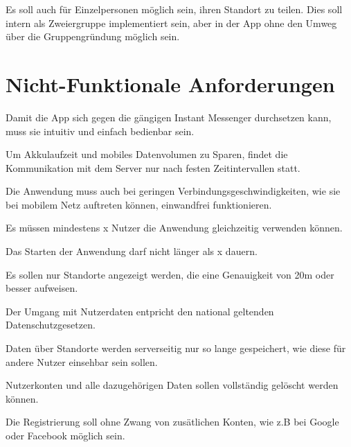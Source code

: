 \documentclass[parskip=full,11pt]{scrartcl}
\begin{document}
Es soll auch für Einzelpersonen möglich sein, ihren Standort zu teilen.
Dies soll intern als Zweiergruppe implementiert sein, aber in der App ohne den Umweg über die Gruppengründung möglich sein.
    

\section{Nicht-Funktionale Anforderungen}

Damit die App sich gegen die gängigen Instant Messenger durchsetzen kann, muss sie intuitiv und einfach bedienbar sein.

Um Akkulaufzeit und mobiles Datenvolumen zu Sparen, findet die Kommunikation mit dem Server nur nach festen Zeitintervallen statt.

Die Anwendung muss auch bei geringen Verbindungsgeschwindigkeiten, wie sie bei mobilem Netz auftreten können, einwandfrei funktionieren.

Es müssen mindestens x Nutzer die Anwendung gleichzeitig verwenden können.  %

Das Starten der Anwendung darf nicht länger als x dauern.   %

Es sollen nur Standorte angezeigt werden, die eine Genauigkeit von 20m oder besser aufweisen.

Der Umgang mit Nutzerdaten entpricht den national geltenden Datenschutzgesetzen.

Daten über Standorte werden serverseitig nur so lange gespeichert, wie diese für andere Nutzer einsehbar sein sollen.

Nutzerkonten und alle dazugehörigen Daten sollen vollständig gelöscht werden können.

Die Registrierung soll ohne Zwang von zusätlichen Konten, wie z.B bei Google oder Facebook möglich sein.
\end{document}
